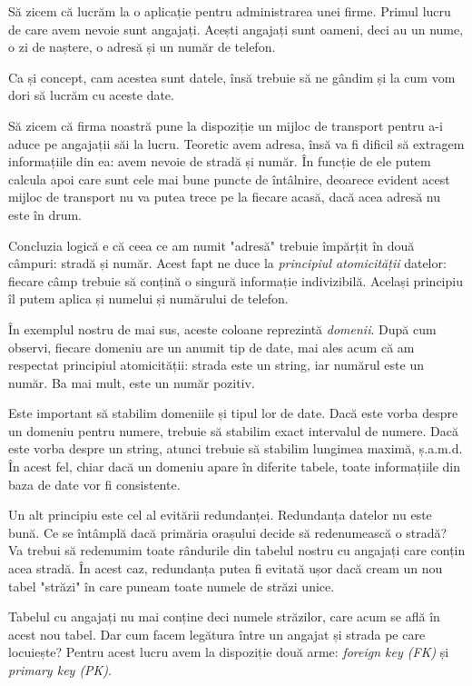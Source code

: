 Să zicem că lucrăm la o aplicație pentru administrarea unei firme. Primul
lucru de care avem nevoie sunt angajați. Acești angajați sunt oameni, deci
au un nume, o zi de naștere, o adresă și un număr de telefon.

Ca și concept, cam acestea sunt datele, însă trebuie să ne gândim și la cum
vom dori să lucrăm cu aceste date.

Să zicem că firma noastră pune la dispoziție un mijloc de transport pentru
a-i aduce pe angajații săi la lucru. Teoretic avem adresa, însă va fi dificil
să extragem informațiile din ea: avem nevoie de stradă și număr. În funcție de
ele putem calcula apoi care sunt cele mai bune puncte de întâlnire, deoarece
evident acest mijloc de transport nu va putea trece pe la fiecare acasă, dacă
acea adresă nu este în drum.

Concluzia logică e că ceea ce am numit "adresă" trebuie împărțit în două câmpuri:
stradă și număr. Acest fapt ne duce la \textsl{principiul atomicității}
datelor: fiecare
câmp trebuie să conțină o singură informație indivizibilă. Același principiu îl
putem aplica și numelui și numărului de telefon.

În exemplul nostru de mai sus, aceste coloane reprezintă \textsl{domenii}. După
cum observi, fiecare domeniu are un anumit tip de date, mai ales acum că am
respectat principiul atomicității: strada este un string, iar numărul este un
număr. Ba mai mult, este un număr pozitiv.

Este important să stabilim domeniile și tipul lor de date. Dacă este vorba despre
un domeniu pentru numere, trebuie să stabilim exact intervalul de numere. Dacă
este vorba despre un string, atunci trebuie să stabilim lungimea maximă, ș.a.m.d.
În acest fel, chiar dacă un domeniu apare în diferite tabele, toate informațiile
din baza de date vor fi consistente.

Un alt principiu este cel al evitării redundanței. Redundanța datelor nu este
bună. Ce se întâmplă dacă primăria orașului decide să redenumească o stradă?
Va trebui să redenumim toate rândurile din tabelul nostru cu angajați care
conțin acea stradă. În acest caz, redundanța putea fi evitată ușor dacă
cream un nou tabel "străzi" în care puneam toate numele de străzi unice.

Tabelul cu angajați nu mai conține deci numele străzilor, care acum se află
în acest nou tabel. Dar cum facem legătura între un angajat și strada pe care
locuiește? Pentru acest lucru avem la dispoziție două arme: \textsl{foreign key
(FK)}
și \textsl{primary key (PK)}.

